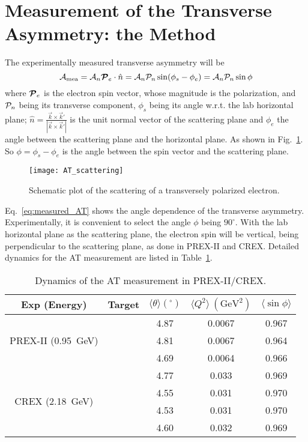 \section{Measurement of the Transverse Asymmetry: the Method}
The experimentally measured transverse asymmetry will be
\begin{equation}
    \mathcal{A}_{\text{mea}} = \mathcal{A}_n \boldsymbol{\mathcal{P}}_e \cdot \hat{n} = \mathcal{A}_n \mathcal{P}_n \sin(\phi_s - \phi_e) = \mathcal{A}_n \mathcal{P}_n \sin\phi
    \label{eq:measured_AT}
\end{equation}
where $\boldsymbol{\mathcal{P}}_e$ is the electron spin vector, whose magnitude is the polarization,
and $\mathcal{P}_n$ being its transverse component,
$\phi_s$ being its angle w.r.t. the lab horizontal plane; 
$\hat{n} = \frac{\vec{k} \times \vec{k}'}{|\vec{k} \times \vec{k}'|}$ 
is the unit normal vector of the scattering plane and $\phi_e$ the angle between
the scattering plane and the horizontal plane. As shown in Fig.~\ref{fig:AT_scattering}.
So $\phi = \phi_s - \phi_e$ is the angle between the spin vector and the scattering plane.
\begin{figure}[h!]
    \centering
    \texttt{[image: AT\_scattering]}
    \caption{Schematic plot of the scattering of a transversely polarized electron.}
    \label{fig:AT_scattering}
\end{figure}

Eq.~\ref{eq:measured_AT} shows the angle dependence of the transverse asymmetry. 
Experimentally, it is convenient to select the angle $\phi$ being $90^\circ$. 
With the lab horizontal plane as the scattering plane, the electron spin will
be vertical, being perpendicular to the scattering plane, as done in PREX-II and CREX. 
Detailed dynamics for the AT measurement are listed in Table~\ref{tab:AT_dynamics}.

\begin{table}
    \centering
    \begin{tabular}{c c | c c c}
	\hline
	Exp (Energy)	& Target    & $\langle \theta \rangle ({}^\circ)$   & $\langle Q^2 \rangle \ (\mathrm{GeV}^2)$	& $\langle \sin\phi \rangle$	\\
	\hline
	\multirow{3}{*}{PREX-II (0.95~GeV)}
	    & \C    & 4.87  & 0.0067    & 0.967 \\ 
	    & \ca   & 4.81  & 0.0067    & 0.964 \\ 
	    & \Pb   & 4.69  & 0.0064    & 0.966 \\ 
	\hline
	\multirow{4}{*}{CREX (2.18~GeV)}
	    & \C    & 4.77  & 0.033	& 0.969 \\ 
	    & \ca   & 4.55  & 0.031	& 0.970 \\ 
	    & \Ca   & 4.53  & 0.031     & 0.970 \\ 
	    & \Pb   & 4.60  & 0.032     & 0.969 \\ 
	\hline
    \end{tabular}
    \caption{Dynamics of the AT measurement in PREX-II/CREX.}
    \label{tab:AT_dynamics}
\end{table}

